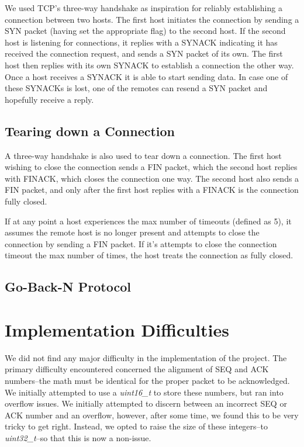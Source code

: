 \documentclass[12pt]{article}
\begin{document}
We used TCP's three-way handshake as inspiration for reliably establishing a connection between two hosts. The first host initiates the connection by sending a SYN packet (having set the appropriate flag) to the second host. If the second host is listening for connections, it replies with a SYNACK indicating it has received the connection request, and sends a SYN packet of its own. The first host then replies with its own SYNACK to establish a connection the other way. Once a host receives a SYNACK it is able to start sending data. In case one of these SYNACKs is lost, one of the remotes can resend a SYN packet and hopefully receive a reply.

\subsection{Tearing down a Connection}

A three-way handshake is also used to tear down a connection. The first host wishing to close the connection sends a FIN packet, which the second host replies with FINACK, which closes the connection one way. The second host also sends a FIN packet, and only after the first host replies with a FINACK is the connection fully closed.

If at any point a host experiences the max number of timeouts (defined as 5), it assumes the remote host is no longer present and attempts to close the connection by sending a FIN packet. If it's attempts to close the connection timeout the max number of times, the host treats the connection as fully closed.

\subsection{Go-Back-N Protocol}

\section{Implementation Difficulties}
We did not find any major difficulty in the implementation of the project. The primary difficulty encountered concerned the alignment of SEQ and ACK numbers--the math must be identical for the proper packet to be acknowledged. We initially attempted to use a \emph{uint16\_t} to store these numbers, but ran into overflow issues. We initially attempted to discern between an incorrect SEQ or ACK number and an overflow, however, after some time, we found this to be very tricky to get right. Instead, we opted to raise the size of these integers--to \emph{uint32\_t}--so that this is now a non-issue.
\end{document}
